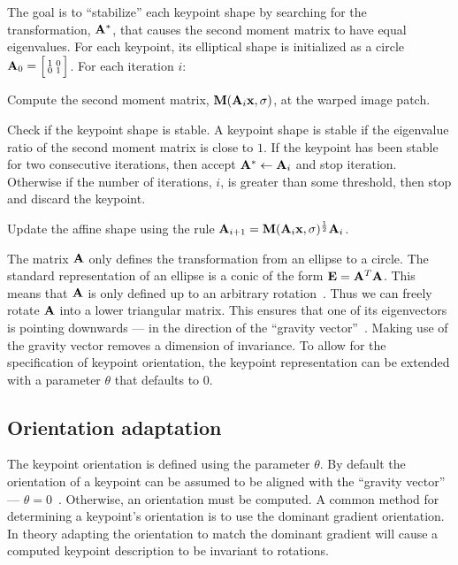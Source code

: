         The goal is to ``stabilize'' each keypoint shape by searching for the transformation, $\mathbf{A}^*$, that
        causes the second moment matrix to have equal eigenvalues. For each keypoint, its elliptical shape is
        initialized as a circle $\mathbf{A}_0= \Bigl[ \begin{smallmatrix} 1 & 0\\0 & 1 \end{smallmatrix} \Bigr] $. For each iteration $i$:

        \begin{enumln}

            \item Compute the second moment matrix, $\mathbf{M}(\mathbf{A}_i\mathbf{x}, \sigma)$, at the warped image patch.

            \item Check if the keypoint shape is stable. A keypoint shape is stable if the eigenvalue ratio of the
            second moment matrix is close to $1$. If the keypoint has been stable for two consecutive iterations,
            then accept $\mathbf{A}^* \leftarrow \mathbf{A}_{i}$ and stop iteration. Otherwise if the number of iterations,
            $i$, is greater than some threshold, then stop and discard the keypoint.

            \item Update the affine shape  using the rule
                $\mathbf{A}_{i + 1} = \mathbf{M}(\mathbf{A}_i\mathbf{x}, \sigma)^{\frac{1}{2}} \mathbf{A}_i$.
        \end{enumln}

        The matrix $\mathbf{A}$ only defines the transformation from an ellipse to a circle. The standard representation
        of an ellipse is a conic of the form $\mathbf{E} = \mathbf{A}^T\mathbf{A}$. This means that $\mathbf{A}$ is only defined up
        to an arbitrary rotation~\cite{mikolajczyk_comparison_2005,perdoch_efficient_2009}. Thus we can freely
        rotate $\mathbf{A}$ into a lower triangular matrix. This ensures that one of its eigenvectors is pointing
        downwards --- \ie{} in the direction of the ``gravity vector''~\cite{perdoch_efficient_2009}. Making use of
        the gravity vector removes a dimension of invariance. To allow for the specification of keypoint
        orientation, the keypoint representation can be extended with a parameter $\theta$ that defaults to $0$.

    \subsection{Orientation adaptation}

        The keypoint orientation is defined using the parameter $\theta$.
        By default the orientation of a keypoint can be assumed to be aligned with the ``gravity vector'' ---
          \ie{} $\theta=0$~\cite{perdoch_efficient_2009}.
        Otherwise, an orientation must be computed.
        A common method for determining a keypoint's orientation is to use the dominant gradient orientation.
        In theory adapting the orientation to match the dominant gradient will cause a computed keypoint
          description to be invariant to rotations.

